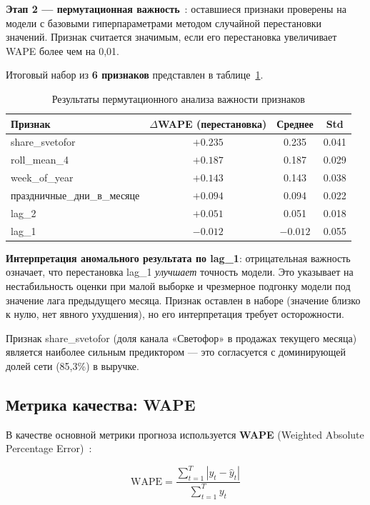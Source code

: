 \textbf{Этап 2 --- пермутационная важность}~\cite{guyon2003introduction}: оставшиеся признаки проверены на модели с базовыми гиперпараметрами методом случайной перестановки значений. Признак считается значимым, если его перестановка увеличивает WAPE более чем на 0,01.

Итоговый набор из \textbf{6 признаков} представлен в таблице~\ref{tab:feature_importance}.

\begin{table}[H]
\centering
\caption{Результаты пермутационного анализа важности признаков}
\label{tab:feature_importance}
\begin{tabular}{lccc}
\toprule
\textbf{Признак} & \textbf{$\Delta$WAPE (перестановка)} & \textbf{Среднее} & \textbf{Std} \\
\midrule
share\_svetofor & $+0.235$ & 0.235 & 0.041 \\
roll\_mean\_4 & $+0.187$ & 0.187 & 0.029 \\
week\_of\_year & $+0.143$ & 0.143 & 0.038 \\
праздничные\_дни\_в\_месяце & $+0.094$ & 0.094 & 0.022 \\
lag\_2 & $+0.051$ & 0.051 & 0.018 \\
lag\_1 & $-0.012$ & $-0.012$ & 0.055 \\
\bottomrule
\end{tabular}
\end{table}

\textbf{Интерпретация аномального результата по lag\_1}: отрицательная важность означает, что перестановка lag\_1 \textit{улучшает} точность модели. Это указывает на нестабильность оценки при малой выборке и чрезмерное подгонку модели под значение лага предыдущего месяца. Признак оставлен в наборе (значение близко к нулю, нет явного ухудшения), но его интерпретация требует осторожности.

Признак share\_svetofor (доля канала «Светофор» в продажах текущего месяца) является наиболее сильным предиктором --- это согласуется с доминирующей долей сети (85,3\%) в выручке.

\subsection{Метрика качества: WAPE}

В качестве основной метрики прогноза используется \textbf{WAPE} (Weighted Absolute Percentage Error)~\cite{hyndman2006another}:

\begin{equation}
\text{WAPE} = \frac{\sum_{t=1}^{T} |y_t - \hat{y}_t|}{\sum_{t=1}^{T} y_t}
\end{equation}

